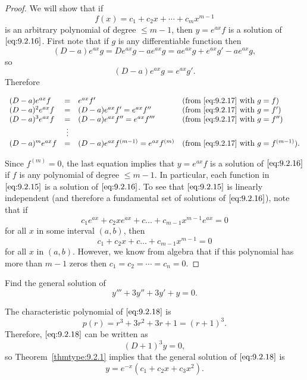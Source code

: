 \documentclass{ximera}
\begin{document}
\begin{proof}
We will show that if
$$
f(x)=c_1+c_2x+\cdots+c_mx^{m-1}
$$
is an arbitrary polynomial of degree $\le m-1$, then $y=e^{ax}f$
is a solution of $\eqref{eq:9.2.16}$. First note that if $g$ is any
differentiable function then
$$
(D-a)e^{ax}g=De^{ax}g-ae^{ax}g=ae^{ax}g+e^{ax}g'-ae^{ax}g,
$$
so
\begin{equation} \label{eq:9.2.17}
(D-a)e^{ax}g=e^{ax}g'.
\end{equation}
Therefore

$$
\begin{array}{lcll}
(D-a)e^{ax}f&=&e^{ax}f'&\mbox{(from \eqref{eq:9.2.17} with
$g=f$)}\\
(D-a)^2e^{ax}f&=&
(D-a)e^{ax}f'=e^{ax}f''
&\mbox{(from \eqref{eq:9.2.17} with $g=f'$)}\\
(D-a)^3e^{ax}f&=&
(D-a)e^{ax}f''=e^{ax}f'''
&\mbox{(from \eqref{eq:9.2.17} with $g=f''$)}\\
&\vdots&\\
(D-a)^me^{ax}f
&=&(D-a)e^{ax}f^{(m-1)}=e^{ax}f^{(m)}
&\mbox{(from \eqref{eq:9.2.17} with $g=f^{(m-1)}$)}.
\end{array}
$$

Since $f^{(m)}=0$, the last equation implies that $y=e^{ax}f$ is a
solution of $\eqref{eq:9.2.16}$ if $f$ is any polynomial of degree $\leq
m-1$. In particular, each function in $\eqref{eq:9.2.15}$ is a solution of
$\eqref{eq:9.2.16}$. To see that $\eqref{eq:9.2.15}$ is linearly independent (and
therefore a fundamental set of solutions of $\eqref{eq:9.2.16}$), note that
if
$$
c_1e^{ax}+c_2xe^{ax}+c\dots+c_{m-1}x^{m-1}e^{ax}=0
$$
for all $x$ in some interval $(a,b)$, then
$$
c_1+c_2x+c\dots+c_{m-1}x^{m-1}=0
$$
for all $x$ in $(a,b)$.  However, we know from algebra that if this
polynomial has more than $m-1$ zeros then $c_1=c_2=\cdots=c_n=0$.
\end{proof}

\begin{example}\label{example:9.2.5}
Find the general solution of
\begin{equation} \label{eq:9.2.18}
y'''+3y''+3y'+y=0.
\end{equation}


\begin{explanation} The characteristic polynomial of $\eqref{eq:9.2.18}$ is
$$
p(r)=r^3+3r^2+3r+1=(r+1)^3.
$$
Therefore, $\eqref{eq:9.2.18}$ can be written as
$$
(D+1)^3y=0,
$$
so Theorem~\ref{thmtype:9.2.1} implies that the general solution of
$\eqref{eq:9.2.18}$ is
$$
y=e^{-x}(c_1+c_2x+c_3x^2).
$$
\end{explanation}
\end{example}
\end{document}
